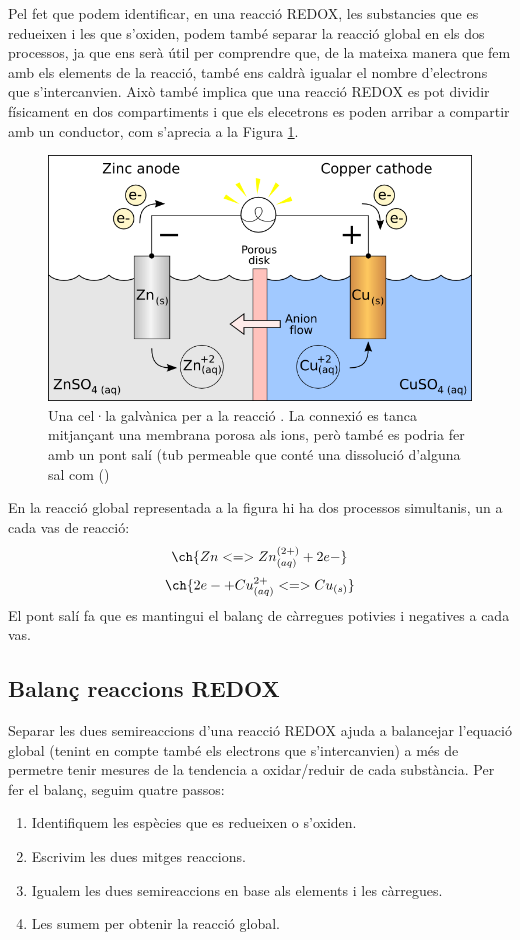 Pel fet que podem identificar, en una reacció REDOX, les substancies que es redueixen i les que s'oxiden, podem també separar la reacció global en els dos processos, ja que ens serà útil per comprendre que, de la mateixa manera que fem amb els elements de la reacció, també ens caldrà igualar el nombre d'electrons que s'intercanvien. Això també implica que una reacció REDOX es pot dividir físicament en dos compartiments i que els elecetrons es poden arribar a compartir amb un conductor, com s'aprecia a la Figura \ref{fig:Galvanic_cell_with_no_cation_flow}.

\begin{figure}[h]
\centering
\includegraphics[scale=0.5]{figures/Galvanic_cell_with_no_cation_flow.png}
\caption{Una cel·la galvànica per a la reacció 
. 
La connexió es tanca mitjançant una membrana porosa als ions, però també es podria fer amb un pont salí (tub permeable que conté una dissolució d'alguna sal com  ()}
\label{fig:Galvanic_cell_with_no_cation_flow}
\end{figure}

En la reacció global representada a la figura hi ha dos processos simultanis, un a cada vas de reacció:
\[\ch{Zn <=> Zn^{(2+)}_{(aq)} + 2 e-}\]
\[\ch{2 e- + Cu^{2+}_{(aq)} <=> Cu_{(s)}}\]
El pont salí fa que es mantingui el balanç de càrregues potivies i negatives a cada vas.


\subsection{Balanç reaccions REDOX}

Separar les dues semireaccions d'una reacció REDOX ajuda a balancejar l'equació global (tenint en compte també els electrons que s'intercanvien) a més de permetre tenir mesures de la tendencia a oxidar/reduir de cada substància.
Per fer el balanç, seguim quatre passos:
\begin{enumerate}
\item Identifiquem les espècies que es redueixen o s'oxiden.
\item Escrivim les dues mitges reaccions.
\item Igualem les dues semireaccions en base als elements i les càrregues.
\item Les sumem per obtenir la reacció global.
\end{enumerate}

